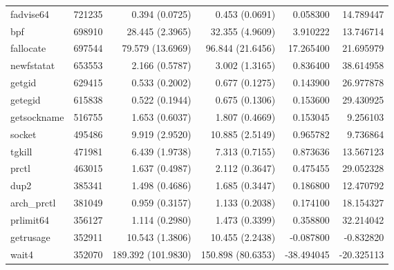 \begin{longtable}{>{\ttfamily}lrrrrr}
                      fadvise64 &      721235 &           0.394 (0.0725) &           0.453 (0.0691) &        0.058300 &    14.789447 \\
                            bpf &      698910 &          28.445 (2.3965) &          32.355 (4.9609) &        3.910222 &    13.746714 \\
                      fallocate &      697544 &         79.579 (13.6969) &         96.844 (21.6456) &       17.265400 &    21.695979 \\
                     newfstatat &      653553 &           2.166 (0.5787) &           3.002 (1.3165) &        0.836400 &    38.614958 \\
                         getgid &      629415 &           0.533 (0.2002) &           0.677 (0.1275) &        0.143900 &    26.977878 \\
                        getegid &      615838 &           0.522 (0.1944) &           0.675 (0.1306) &        0.153600 &    29.430925 \\
                    getsockname &      516755 &           1.653 (0.6037) &           1.807 (0.4669) &        0.153045 &     9.256103 \\
                         socket &      495486 &           9.919 (2.9520) &          10.885 (2.5149) &        0.965782 &     9.736864 \\
                         tgkill &      471981 &           6.439 (1.9738) &           7.313 (0.7155) &        0.873636 &    13.567123 \\
                          prctl &      463015 &           1.637 (0.4987) &           2.112 (0.3647) &        0.475455 &    29.052328 \\
                           dup2 &      385341 &           1.498 (0.4686) &           1.685 (0.3447) &        0.186800 &    12.470792 \\
                    arch\_prctl &      381049 &           0.959 (0.3157) &           1.133 (0.2038) &        0.174100 &    18.154327 \\
                      prlimit64 &      356127 &           1.114 (0.2980) &           1.473 (0.3399) &        0.358800 &    32.214042 \\
                      getrusage &      352911 &          10.543 (1.3806) &          10.455 (2.2438) &       -0.087800 &    -0.832820 \\
                          wait4 &      352070 &       189.392 (101.9830) &        150.898 (80.6353) &      -38.494045 &   -20.325113 \\

\end{longtable}
